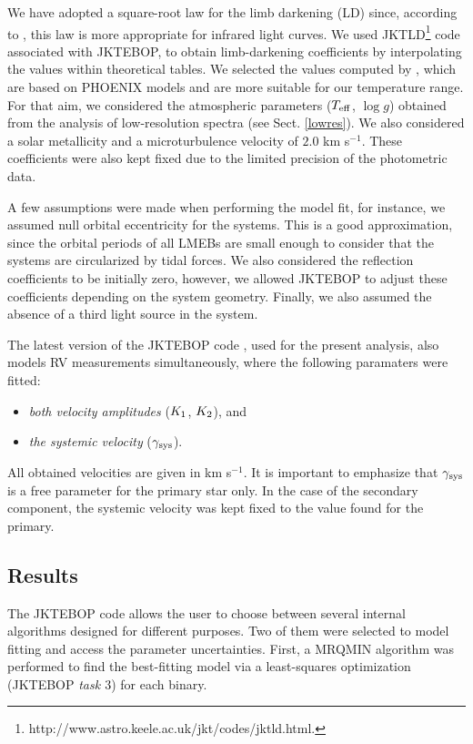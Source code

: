 \documentclass[fleqn,usenatbib]{mnras}
\begin{document}
We have adopted a square-root law for the limb darkening (LD) since, according to \citet{vanHamme93}, this law is more appropriate for infrared light curves. We used JKTLD\footnote{http://www.astro.keele.ac.uk/jkt/codes/jktld.html.} code \citep{Southworth07} associated with JKTEBOP, to obtain limb-darkening coefficients by interpolating the values within theoretical tables. We selected the values computed by \citet{Claret00}, which are based on PHOENIX models \citep{Allard97} and are more suitable for our temperature range. 
For that aim, we considered the atmospheric parameters ($T_{\rm eff}$, $\log g$) obtained from the analysis of low-resolution spectra (see Sect. \ref{lowres}). We also considered a solar metallicity and a microturbulence velocity of $2.0$ km s$^{-1}$. These coefficients were also kept fixed due to the limited precision of the photometric data.

A few assumptions were made when performing the model fit, for instance, we assumed null orbital eccentricity for the systems. This is a good approximation, since the orbital periods of all LMEBs are small enough to consider that the systems are circularized by tidal forces. We also considered the reflection coefficients to be initially zero, however, we allowed JKTEBOP to adjust these coefficients depending on the system geometry. Finally, we also assumed the absence of a third light source in the system.

The latest version of the JKTEBOP code \citep{Southworth13}, used for the present analysis, also models RV measurements simultaneously, where the following paramaters were fitted:
\begin{itemize}
\renewcommand\labelitemi{--}
\item {\em both velocity amplitudes} ($K_{\rm 1}$, $K_{\rm 2}$), and
\item {\em the systemic velocity} ($\gamma_{\rm sys}$).
\end{itemize}
All obtained velocities are given in km s$^{-1}$. It is important to emphasize that $\gamma_{\rm sys}$ is a free parameter for the primary star only. In the case of the secondary component, the systemic velocity was kept fixed to the value found for the primary.


\subsection{Results}\label{sec:res}

The JKTEBOP code allows the user to choose between several internal algorithms designed for different purposes. Two of them were selected to model fitting and access the parameter uncertainties. First, a MRQMIN algorithm \citep{Press92} was performed  to find the best-fitting model via a least-squares optimization (JKTEBOP {\it task $3$}) for each binary. 
\end{document}
